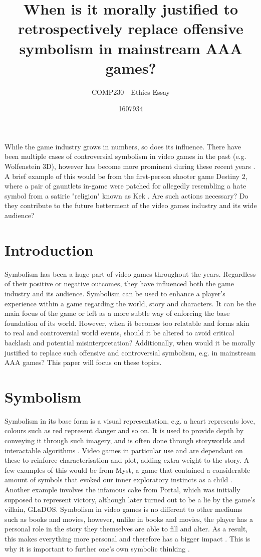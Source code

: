 \documentclass{scrartcl}
\title{When is it morally justified to retrospectively replace offensive symbolism in mainstream AAA games?}
\subtitle{COMP230 - Ethics Essay}
\author{1607934}
\begin{document}
\maketitle

\abstract{} 
While the game industry grows in numbers, so does its influence. There have been multiple cases of controversial symbolism in video games in the past (e.g. Wolfenstein 3D), however has become more prominent during these recent years \cite{jakub}. A brief example of this would be from the first-person shooter game Destiny 2, where a pair of gauntlets in-game were patched for allegedly resembling a hate symbol from a satiric "religion" known as Kek \cite{samit} \cite{kerr}. Are such actions necessary? Do they contribute to the future betterment of the video games industry and its wide audience?

\section{Introduction}
Symbolism has been a huge part of video games throughout the years. Regardless of their positive or negative outcomes, they have influenced both the game industry and its audience. Symbolism can be used to enhance a player's experience within a game regarding the world, story and characters. It can be the main focus of the game or left as a more subtle way of enforcing the base foundation of its world. However, when it becomes too relatable and forms akin to real and controversial world events, should it be altered to avoid critical backlash and potential misinterpretation? Additionally, when would it be morally justified to replace such offensive and controversial symbolism, e.g. in mainstream AAA games? This paper will focus on these topics.


\section{Symbolism}
Symbolism in its base form is a visual representation, e.g. a heart represents love, colours such as red represent danger and so on. It is used to provide depth by conveying it through such imagery, and is often done through storyworlds and interactable algorithms \cite{Bruchansky} \cite{nieva}. Video games in particular use and are dependant on these to reinforce characterisation and plot, adding extra weight to the story. A few examples of this would be from Myst, a game that contained a considerable amount of symbols that evoked our inner exploratory instincts as a child \cite{xander}. Another example involves the infamous cake from Portal, which was initially supposed to represent victory, although later turned out to be a lie by the game's villain, GLaDOS. Symbolism in video games is no different to other mediums such as books and movies, however, unlike in books and movies, the player has a personal role in the story they themselves are able to fill and alter. As a result, this makes everything more personal and therefore has a bigger impact \cite{Depth}. This is why it is important to further one's own symbolic thinking \cite{jefforkin}.
\end{document}
